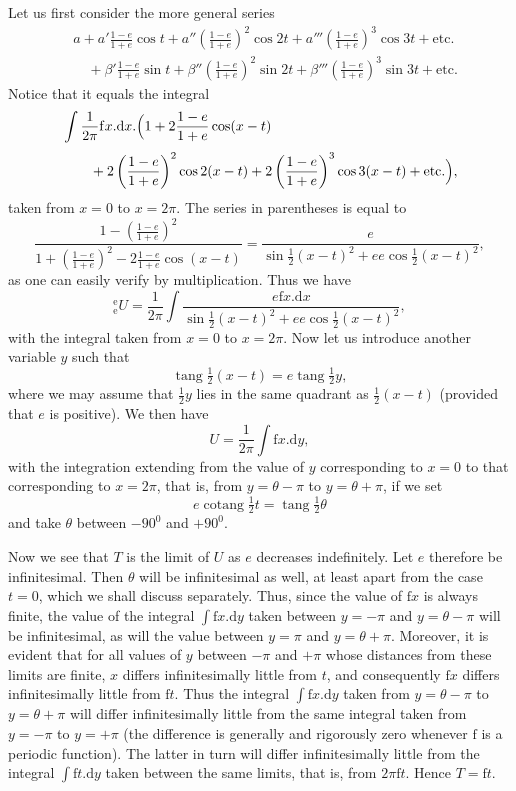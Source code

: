 Let us first consider the more general series
\[
\tag*{(U)}\begin{aligned}
&a+a'\tfrac{1-e}{1+e}\cos t+a''\left(\tfrac{1-e}{1+e}\right)^2\cos2t+a'''\left(\tfrac{1-e}{1+e}\right)^3\cos3t+\text{etc.}\\[3pt]
&\quad{}+\beta'\tfrac{1-e}{1+e}\sin t+\beta''\left(\tfrac{1-e}{1+e}\right)^2\sin2t+\beta'''\left(\tfrac{1-e}{1+e}\right)^3\sin3t+\text{etc.}
\end{aligned}
\]
\noindent Notice that it equals the integral
\[
\begin{aligned}
&\int\frac{1}{2\pi}\mathrm{f}x.\mathrm{d}x.\Bigl(1+2\frac{1-e}{1+e}\cos(x-t)\\[3pt]
&\qquad{}+2\left(\frac{1-e}{1+e}\right)^2\cos2(x-t)+2\left(\frac{1-e}{1+e}\right)^3\cos3(x-t)+\text{etc.}\Bigr),
\end{aligned}
\]
\noindent taken from \(x=0\) to \(x=2\pi\). The series in parentheses is equal to
\[
\frac{1-\left(\frac{1-e}{1+e}\right)^2}{1+\left(\frac{1-e}{1+e}\right)^2-2\frac{1-e}{1+e}\cos(x-t)}
=\frac{e}{\sin\tfrac12(x-t)^2+ee\cos\tfrac12(x-t)^2},
\]
\noindent as one can easily verify by multiplication. Thus we have
\[
{}^{\mathrm{e}}_{\mathrm{e}}\!U=\frac{1}{2\pi}\int\frac{e\mathrm{f}x.\mathrm{d}x}{\sin\tfrac12(x-t)^2+ee\cos\tfrac12(x-t)^2},
\]
\noindent with the integral taken from \(x=0\) to \(x=2\pi\). Now let us introduce another variable \(y\) such that
\[
\operatorname{tang}\tfrac12(x-t)=e\operatorname{tang}\tfrac12y,
\]
\noindent where we may assume that \(\tfrac12y\) lies in the same quadrant as \(\tfrac12(x-t)\) (provided that \(e\) is positive). We then have
\[
U=\frac{1}{2\pi}\int\mathrm{f}x.\mathrm{d}y,
\]
\noindent with the integration extending from the value of \(y\) corresponding to \(x=0\) to that corresponding to \(x=2\pi\), that is, from \(y=\theta-\pi\) to \(y=\theta+\pi\), if we set
\[
e\operatorname{cotang}\tfrac12t=\operatorname{tang}\tfrac12\theta
\]
\noindent and take \(\theta\) between \(-90^0\) and \(+90^0\).
\par
Now we see that \(T\) is the limit of \(U\) as \(e\) decreases indefinitely. Let \(e\) therefore be infinitesimal. Then \(\theta\) will be infinitesimal as well, at least apart from the case \(t=0\), which we shall discuss separately. Thus, since the value of \(\mathrm{f}x\) is always finite, the value of the integral \(\int\mathrm{f}x.\mathrm{d}y\) taken between \(y=-\pi\) and \(y=\theta-\pi\) will be infinitesimal, as will the value between \(y=\pi\) and \(y=\theta+\pi\). Moreover, it is evident that for all values of \(y\) between \(-\pi\) and \(+\pi\) whose distances from these limits are finite, \(x\) differs infinitesimally little from \(t\), and consequently \(\mathrm{f}x\) differs infinitesimally little from \(\mathrm{f}t\). Thus the integral \(\int\mathrm{f}x.\mathrm{d}y\) taken from \(y=\theta-\pi\) to \(y=\theta+\pi\) will differ infinitesimally little from the same integral taken from \(y=-\pi\) to \(y=+\pi\) (the difference is generally and rigorously zero whenever \(\mathrm{f}\) is a periodic function). The latter in turn will differ infinitesimally little from the integral \(\int\mathrm{f}t.\mathrm{d}y\) taken between the same limits, that is, from \(2\pi\mathrm{f}t\). Hence \(T=\mathrm{f}t\).
